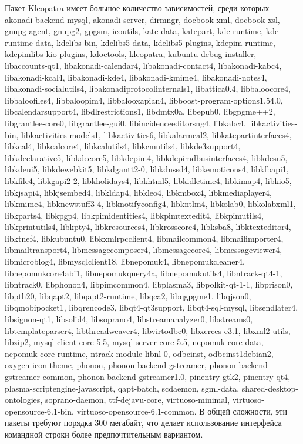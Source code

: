 \documentclass[a4paper, 12pt]{article}		%
\begin{document}
Пакет Kleopatra имеет большое количество зависимостей, среди которых akonadi-backend-mysql, akonadi-server, dirmngr, docbook-xml, docbook-xsl, gnupg-agent, gnupg2, gpgsm, icoutils, kate-data, katepart, kde-runtime, kde-runtime-data, kdelibs-bin, kdelibs5-data, kdelibs5-plugins, kdepim-runtime, kdepimlibs-kio-plugins, kdoctools, kleopatra, kubuntu-debug-installer, libaccounts-qt1, libakonadi-calendar4, libakonadi-contact4, libakonadi-kabc4, libakonadi-kcal4, libakonadi-kde4, libakonadi-kmime4, libakonadi-notes4, libakonadi-socialutils4, libakonadiprotocolinternals1, libattica0.4, libbaloocore4, libbaloofiles4, libbaloopim4, libbalooxapian4, libboost-program-options1.54.0, libcalendarsupport4, libdlrestrictions1, libdmtx0a, libepub0, libgpgme++2, libgrantlee-core0, libgrantlee-gui0, libincidenceeditorsng4, libkabc4, libkactivities-bin, libkactivities-models1, libkactivities6, libkalarmcal2, libkatepartinterfaces4, libkcal4, libkcalcore4, libkcalutils4, libkcmutils4, libkde3support4, libkdeclarative5, libkdecore5, libkdepim4, libkdepimdbusinterfaces4, libkdesu5, libkdeui5, libkdewebkit5, libkdgantt2-0, libkdnssd4, libkemoticons4, libkfbapi1, libkfile4, libkgapi2-2, libkholidays4, libkhtml5, libkidletime4, libkimap4, libkio5, libkjsapi4, libkjsembed4, libkldap4, libkleo4, libkmbox4, libkmediaplayer4, libkmime4, libknewstuff3-4, libknotifyconfig4, libkntlm4, libkolab0, libkolabxml1, libkparts4, libkpgp4, libkpimidentities4, libkpimtextedit4, libkpimutils4, libkprintutils4, libkpty4, libkresources4, libkrosscore4, libksba8, libktexteditor4, libktnef4, libkubuntu0, libkxmlrpcclient4, libmailcommon4, libmailimporter4, libmailtransport4, libmessagecomposer4, libmessagecore4, libmessageviewer4, libmicroblog4, libmysqlclient18, libnepomuk4, libnepomukcleaner4, libnepomukcore4abi1, libnepomukquery4a, libnepomukutils4, libntrack-qt4-1, libntrack0, libphonon4, libpimcommon4, libplasma3, libpolkit-qt-1-1, libprison0, libpth20, libqapt2, libqapt2-runtime, libqca2, libqgpgme1, libqjson0, libqmobipocket1, libqrencode3, libqt4-qt3support, libqt4-sql-mysql, libsendlater4, libsignon-qt1, libsolid4, libsoprano4, libstreamanalyzer0, libstreams0, libtemplateparser4, libthreadweaver4, libvirtodbc0, libxerces-c3.1, libxml2-utils, libzip2, mysql-client-core-5.5, mysql-server-core-5.5, nepomuk-core-data, nepomuk-core-runtime, ntrack-module-libnl-0, odbcinst, odbcinst1debian2, oxygen-icon-theme, phonon, phonon-backend-gstreamer, phonon-backend-gstreamer-common, phonon-backend-gstreamer1.0, pinentry-gtk2, pinentry-qt4, plasma-scriptengine-javascript, qapt-batch, scdaemon, sgml-data, shared-desktop-ontologies, soprano-daemon, ttf-dejavu-core, virtuoso-minimal, virtuoso-opensource-6.1-bin, virtuoso-opensource-6.1-common. В общей сложности, эти пакеты требуют порядка 300 мегабайт, что делает использование интерфейса командной строки более предпочтительным вариантом.
\end{document}
